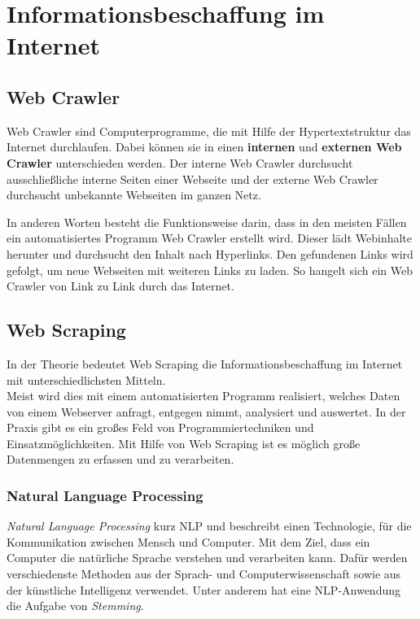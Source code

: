 \section{Informationsbeschaffung im Internet}
	\subsection{Web Crawler}
		Web Crawler sind Computerprogramme, die mit Hilfe der Hypertextstruktur das Internet durchlaufen. Dabei können sie in einen \textbf{internen} und \textbf{externen Web Crawler} unterschieden werden. Der interne Web Crawler durchsucht ausschließliche interne Seiten einer Webseite und der externe Web Crawler durchsucht unbekannte Webseiten im ganzen Netz. \cite{sharma2012study}

		In anderen Worten besteht die Funktionsweise darin, dass in den meisten Fällen ein automatisiertes Programm Web Crawler erstellt wird. Dieser lädt Webinhalte herunter und durchsucht den Inhalt nach Hyperlinks. Den gefundenen Links wird gefolgt, um neue Webseiten mit weiteren Links zu laden. So hangelt sich ein Web Crawler von Link zu Link durch das Internet.\cite{WebScraping}
		
	\subsection{Web Scraping}
		In der Theorie bedeutet Web Scraping die Informationsbeschaffung im Internet mit unterschiedlichsten Mitteln. \cite{WebScraping}\\		
		Meist wird dies mit einem automatisierten Programm realisiert, welches Daten von einem Webserver anfragt, entgegen nimmt, analysiert und auswertet. 
		In der Praxis gibt es ein großes Feld von Programmiertechniken und Einsatzmöglichkeiten.
		Mit Hilfe von Web Scraping ist es möglich große Datenmengen zu erfassen und zu verarbeiten.\cite{WebScraping}

		\subsubsection{Natural Language Processing}
			\textit{Natural Language Processing} kurz NLP und beschreibt einen Technologie, für die Kommunikation zwischen Mensch und Computer. Mit dem Ziel, dass ein Computer die natürliche Sprache verstehen und verarbeiten kann. Dafür werden verschiedenste Methoden aus der Sprach- und Computerwissenschaft sowie aus der künstliche Intelligenz verwendet. Unter anderem hat eine NLP-Anwendung die Aufgabe von \textit{Stemming}.\cite{NLP} 
	
